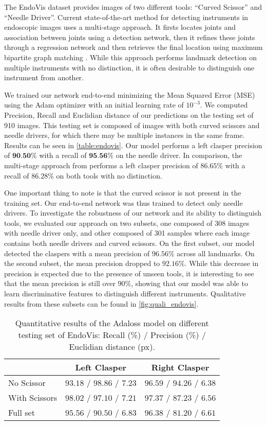 \documentclass[10pt,twocolumn,letterpaper]{article}
\begin{document}
The EndoVis dataset provides
images of two different tools: ``Curved Scissor'' and ``Needle
Driver''. Current state-of-the-art method for detecting instruments in
endoscopic images uses a multi-stage approach. It firsts
locates joints and association between joints using a detection
network, then it refines these joints through a regression network and then
retrieves the final location using maximum bipartite graph matching
\cite{tmi}. While this approach performs landmark detection on
multiple instruments with no distinction, it is often desirable to
distinguish one instrument from another.  

We trained our network end-to-end minimizing the Mean Squared
Error (MSE) using the Adam optimizer \cite{kingma2015} with an initial
learning rate of $10^{-3}$. 
We computed Precision, Recall and Euclidian distance of our predictions
on the testing set of 910 images. This testing set is composed of images with both
curved scissors and needle drivers, for which there may be multiple instances in the
same frame. Results can be seen in \autoref{table:endovis}. Our model performs a
left clasper precision of $\textbf{90.50\%}$ with a recall of $\textbf{95.56\%}$ on the
needle driver. In comparison, the multi-stage approach from \cite{tmi} performs
a left clasper precision of $86.65\%$ with a recall of $86.28\%$ on both tools with no
distinction.

One important thing to note is that the curved scissor is not present in the training set.
Our end-to-end network was thus trained to detect only needle drivers. To investigate
the robustness of our network and its ability to distinguish tools, we evaluated
our approach on two subsets, one composed of 308 images with needle driver only, and other
composed of 301 samples where each image contains both needle drivers and curved scissors.
On the first subset, our model detected the claspers with a mean precision of $96.56\%$
across all landmarks. On the second subset, the mean precision dropped to $92.16\%$. While
this decrease in precision is expected due to the presence of unseen tools, it is interesting
to see that the mean precision is still over $90\%$, showing that our model was able to learn
discriminative features to distinguish different instruments. Qualitative results from
these subsets can be found in \autoref{fig:quali_endovis}.

\begin{table}[h]
  \centering
  \begin{tabular}{|l|c|c|}
\hline
    & Left Clasper & Right Clasper \\
    \hline
    No Scissor & $93.18$ / $98.86$ / $7.23$ & $96.59$ / $94.26$ / $6.38$ \\
    \hline
    With Scissors & $98.02$ / $97.10$ / $7.21$ & $97.37$ / $87.23$ / $6.56$ \\
    \hline
    Full set & $95.56$ / $90.50$ / $6.83$ & $96.38$ / $81.20$ / $6.61$ \\
    \hline
  \end{tabular}
  \caption{Quantitative results of the Adaloss model on different testing
    set of EndoVis: Recall (\%) / Precision (\%) / Euclidian distance (px).}
  \label{table:endovis}
\end{table}
  
\end{document}
